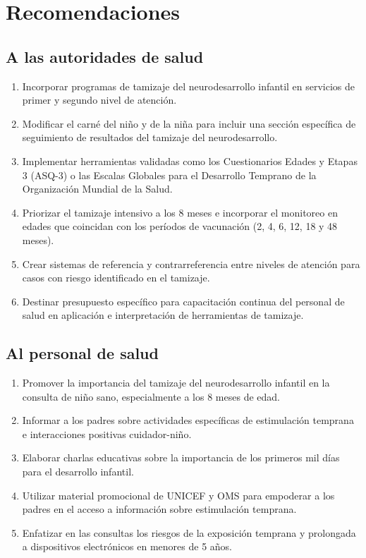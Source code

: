 \section{Recomendaciones}

\subsection*{A las autoridades de salud}
\begin{enumerate}
\item Incorporar programas de tamizaje del neurodesarrollo infantil en 
servicios de primer y segundo nivel de atención.

\item Modificar el carné del niño y de la niña para incluir una sección 
específica de seguimiento de resultados del tamizaje del neurodesarrollo.

\item Implementar herramientas validadas como los Cuestionarios Edades y 
Etapas 3 (ASQ-3) o las Escalas Globales para el Desarrollo Temprano de la 
Organización Mundial de la Salud.

\item Priorizar el tamizaje intensivo a los 8 meses e incorporar el 
monitoreo en edades que coincidan con los períodos de vacunación (2, 4, 6, 
12, 18 y 48 meses).

\item Crear sistemas de referencia y contrarreferencia entre niveles de 
atención para casos con riesgo identificado en el tamizaje.

\item Destinar presupuesto específico para capacitación continua del 
personal de salud en aplicación e interpretación de herramientas de 
tamizaje.
\end{enumerate}

\subsection*{Al personal de salud}
\begin{enumerate}
\item Promover la importancia del tamizaje del neurodesarrollo infantil en 
la consulta de niño sano, especialmente a los 8 meses de edad.

\item Informar a los padres sobre actividades específicas de estimulación 
temprana e interacciones positivas cuidador-niño.

\item Elaborar charlas educativas sobre la importancia de los primeros mil 
días para el desarrollo infantil.

\item Utilizar material promocional de UNICEF y OMS para empoderar a los 
padres en el acceso a información sobre estimulación temprana.

\item Enfatizar en las consultas los riesgos de la exposición temprana y 
prolongada a dispositivos electrónicos en menores de 5 años.
\end{enumerate}

